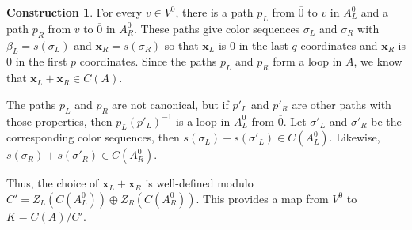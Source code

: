 \documentclass[12pt,twoside,singlespace]{article}
\numberwithin{equation}{section}
\theoremstyle{definition}
\newtheorem{construction}[equation]{Construction}
\renewcommand{\vec}[1]{\mathbf{#1}}
\begin{document}
\begin{construction}
\label{cons:findk}
For every $v\in V^0$, there is a path $p_L$ from $\overline{0}$ to $v$ in $A_L^0$ and a path $p_R$ from $v$ to $\overline{0}$ in $A_R^0$.  These paths give color sequences $\sigma_L$ and $\sigma_R$ with $\beta_L=s(\sigma_L)$ and $\vec{x}_R=s(\sigma_R)$ so that $\vec{x}_L$ is $0$ in the last $q$ coordinates and $\vec{x}_R$ is $0$ in the first $p$ coordinates.  Since the paths $p_L$ and $p_R$ form a loop in $A$, we know that $\vec{x}_L+\vec{x}_R\in C(A)$.

The paths $p_L$ and $p_R$ are not canonical, but if $p'_L$ and $p'_R$ are other paths with those properties, then $p_L(p'_L)^{-1}$ is a loop in $A_L^0$ from $\overline{0}$.  Let $\sigma'_L$ and $\sigma'_R$ be the corresponding color sequences, then $s(\sigma_L)+s(\sigma'_L)\in C(A_L^0)$.  Likewise, $s(\sigma_R)+s(\sigma'_R)\in C(A_R^0)$.

Thus, the choice of $\vec{x}_L+\vec{x}_R$ is well-defined modulo $C'=Z_L(C(A_L^0))\oplus  Z_R(C(A_R^0))$.  This provides a map from $V^0$ to $K=C(A)/C'$.
\end{construction}
\end{document}
